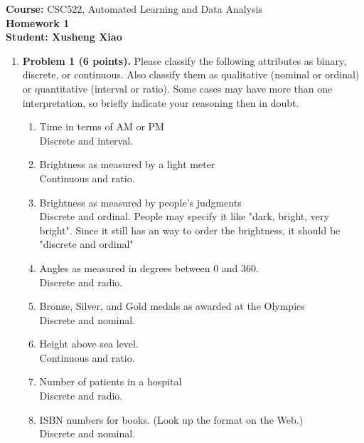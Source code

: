 \documentclass{article}%
\begin{document}
\begin{flushleft}
\textbf{Course:} CSC522, Automated Learning and Data Analysis\\
\textbf{Homework 1}\\
\textbf{Student: Xusheng Xiao}
\end{flushleft}

\noindent{\hrulefill}

\bigskip

\begin{enumerate}
	\item \textbf{Problem 1 (6 points).} Please classify the following attributes as binary, discrete, or continuous. Also classify them as qualitative (nominal or ordinal) or quantitative (interval or ratio). Some cases may have more than one interpretation, so briefly indicate your reasoning then in doubt.	
	\begin{enumerate}
		\item Time in terms of AM or PM \\
		Discrete and interval. 	
		
		\item Brightness as measured by a light meter \\
        Continuous and ratio.		
		
		\item Brightness as measured by people’s judgments \\
	    Discrete and ordinal. People may specify it like "dark, bright, very bright". Since it still has an way to order the brightness, it should be "discrete and ordinal"	
		
		\item Angles as measured in degrees between 0 and 360. \\
		Discrete and radio.
		
		\item Bronze, Silver, and Gold medals as awarded at the Olympics \\
		Discrete and nominal.		
		
		\item Height above sea level. \\
		Continuous and ratio.
		
		\item Number of patients in a hospital \\
		Discrete and radio.		
		
		\item ISBN numbers for books. (Look up the format on the Web.) \\
		Discrete and nominal.		
		

\end{enumerate}
\end{enumerate}
\end{document}
